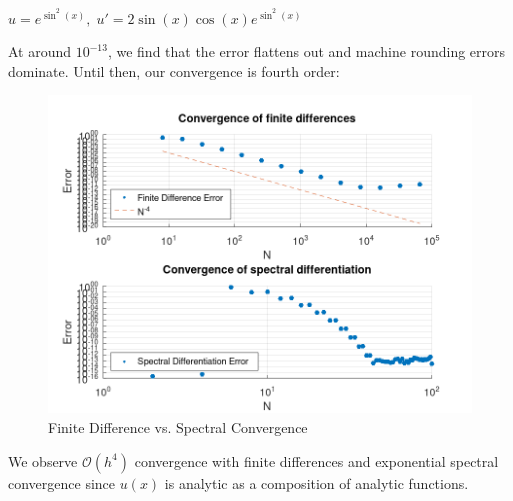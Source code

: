 $u = e^{\sin^2{(x)}},\; u' = 2 \sin{(x)} \cos{(x)} e^{\sin^2{(x)}}$

\begin{solution}
  At around $10^{-13}$, we find that the error flattens out and machine rounding errors dominate. Until then, our convergence is fourth order:

  \begin{figure}[h]
    \centering
    \includegraphics[width=\textwidth]{problem_2a.png}
    \caption{Finite Difference vs. Spectral Convergence}
  \end{figure}

  We observe $\mathcal{O}(h^4)$ convergence with finite differences and exponential spectral convergence since $u(x)$ is
  analytic as a composition of analytic functions.
  \ \\
\end{solution}